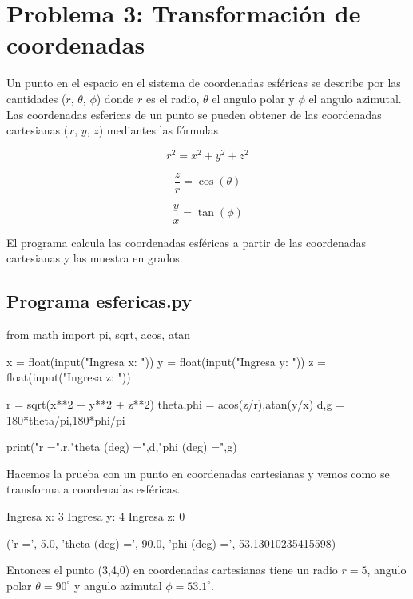 \documentclass[12pt,spanish]{article}
\begin{document}
\section*{Problema 3: Transformación de coordenadas}

Un punto en el espacio en el sistema de coordenadas esféricas se describe por las cantidades ($r$, $\theta$, $\phi$) donde $r$ es el radio, $\theta$ el angulo polar y $\phi$ el angulo azimutal. Las coordenadas esfericas de un punto se pueden obtener de las coordenadas cartesianas ($x$, $y$, $z$) mediantes las fórmulas

  \[r^2 = x^2 + y^2 + z^2 \]

  \[\frac{z}{r} = \cos(\theta) \]

  \[\frac{y}{x} = \tan(\phi) \]

El programa calcula las coordenadas esféricas a partir de las coordenadas cartesianas y las muestra en grados.

\subsection*{Programa esfericas.py}

\begin{center}
 \begin{boxedverbatim}
  from math import pi, sqrt, acos, atan
  
  x = float(input("Ingresa x: "))
  y = float(input("Ingresa y: "))
  z = float(input("Ingresa z: "))
  
  r = sqrt(x**2 + y**2 + z**2)
  theta,phi = acos(z/r),atan(y/x) 
  d,g = 180*theta/pi,180*phi/pi 
  
  print("r =",r,"theta (deg) =",d,"phi (deg) =",g)
 \end{boxedverbatim}
\end{center}

Hacemos la prueba con un punto en coordenadas cartesianas y vemos como se transforma a coordenadas esféricas.

\begin{center}
 \begin{boxedverbatim}
 Ingresa x: 3
 Ingresa y: 4
 Ingresa z: 0
 
 ('r =', 5.0, 
 'theta (deg) =', 90.0, 
 'phi (deg) =', 53.13010235415598)
 \end{boxedverbatim}
\end{center}

Entonces el punto (3,4,0) en coordenadas cartesianas tiene un radio $r=5$, angulo polar $\theta = 90^{\circ}$ y angulo azimutal $\phi = 53.1^{\circ}$.
\end{document}
